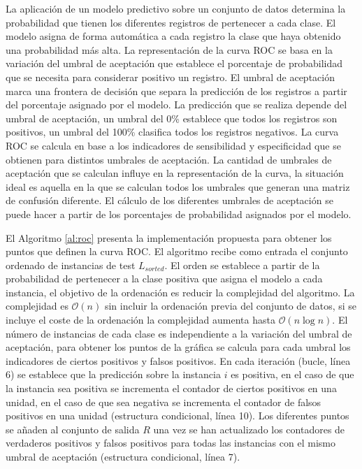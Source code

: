 La aplicación de un modelo predictivo sobre un conjunto de datos determina la probabilidad que tienen los diferentes registros de pertenecer a cada clase. El modelo asigna de forma automática a cada registro la clase que haya obtenido una probabilidad más alta. La representación de la curva ROC se basa en la variación del umbral de aceptación que establece el porcentaje de probabilidad que se necesita para considerar positivo un registro. El umbral de aceptación marca una frontera de decisión que separa la predicción de los registros a partir del porcentaje asignado por el modelo. La predicción que se realiza depende del umbral de aceptación, un umbral del 0\% establece que todos los registros son positivos, un umbral del 100\% clasifica todos los registros negativos. La curva ROC se calcula en base a los indicadores de sensibilidad y especificidad que se obtienen para distintos umbrales de aceptación. La cantidad de umbrales de aceptación que se calculan influye en la representación de la curva, la situación ideal es aquella en la que se calculan todos los umbrales que generan una matriz de confusión diferente. El cálculo de los diferentes umbrales de aceptación se puede hacer a partir de los porcentajes de probabilidad asignados por el modelo.

\bigbreak

El Algoritmo \ref{al:roc} presenta la implementación propuesta para obtener los puntos que definen la curva ROC. El algoritmo recibe como entrada el conjunto ordenado de instancias de test  $L_{sorted}$. El orden se establece a partir de la probabilidad de pertenecer a la clase positiva que asigna el modelo a cada instancia, el objetivo de la ordenación es reducir la complejidad del algoritmo. La complejidad es $\mathcal{O}(n)$ sin incluir la ordenación previa del conjunto de datos, si se incluye el coste de la ordenación la complejidad aumenta hasta $\mathcal{O}(n \log{n})$. El número de instancias de cada clase es independiente a la variación del umbral de aceptación, para obtener los puntos de la gráfica se calcula para cada umbral los indicadores de ciertos positivos y falsos positivos. En cada iteración (bucle, línea 6) se establece que la predicción sobre la instancia $i$ es positiva, en el caso de que la instancia sea positiva se incrementa el contador de ciertos positivos en una unidad, en el caso de que sea negativa se incrementa el contador de falsos positivos en una unidad (estructura condicional, línea 10). Los diferentes puntos se añaden al conjunto de salida $R$ una vez se han actualizado los contadores de verdaderos positivos y falsos positivos para todas las instancias con el mismo umbral de aceptación (estructura condicional, línea 7). 

